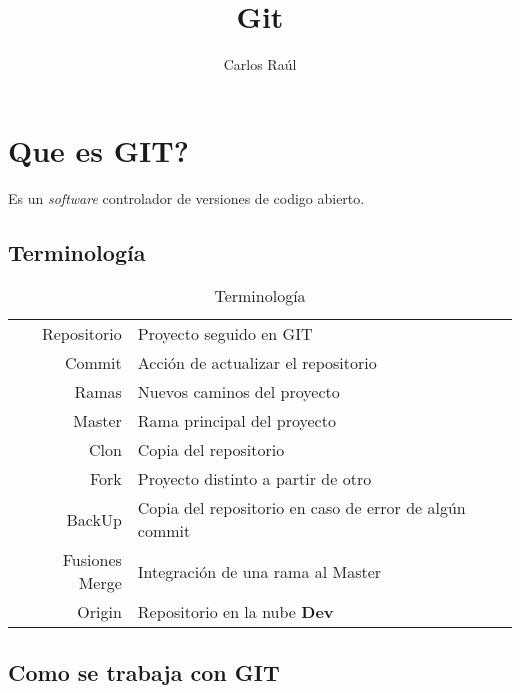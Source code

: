 \documentclass{article}
\title{\color{orange}\textbf{Git}}
\author{Carlos Raúl}
\theoremstyle{mytheoremstyle}
\theoremstyle{mytheoremstyle}
\theoremstyle{myproblemstyle}
\begin{document}
    \maketitle
\section{Que es GIT?}
    Es un \textit{software} controlador de versiones de codigo abierto.
\subsection{Terminología}

    \begin{table}[h!]
        \centering
        \begin{tabular}{r|l}            
            Repositorio & Proyecto seguido en GIT\\
            Commit & Acción de actualizar el repositorio\\ 
            Ramas & Nuevos caminos del proyecto\\ 
            Master & Rama principal del proyecto\\ 
            Clon & Copia del repositorio\\
            Fork & Proyecto distinto a partir de otro\\ 
            BackUp & Copia del repositorio en caso de error de algún commit\\
            Fusiones Merge & Integración de una rama al Master\\
            Origin & Repositorio en la nube \textbf{Dev}
        
        \end{tabular}
        \caption{Terminología}
    \end{table}   
    \subsection{Como se trabaja con GIT}
\end{document}
